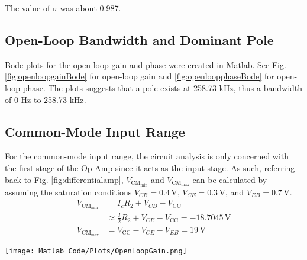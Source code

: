 \documentclass[lettersize,journal]{IEEEtran}
\begin{document}
The value of $\sigma$ was about 0.987.

\subsection{Open-Loop Bandwidth and Dominant Pole}
Bode plots for the open-loop gain and phase were created in Matlab.
See Fig. \ref{fig:openloopgainBode} for open-loop gain and \ref{fig:openloopphaseBode}
for open-loop phase. The plots suggests that a pole exists at 258.73 kHz, thus a 
bandwidth of 0 Hz to 258.73 kHz.

\subsection{Common-Mode Input Range}
For the common-mode input range, the circuit analysis is only 
concerned with the first stage of the Op-Amp since it acts as the 
input stage. As such, referring back to Fig. \ref{fig:differentialamp},
$V_{\text{CM}_{\text{min}}}$ and $V_{\text{CM}_{\text{max}}}$ can be 
calculated by assuming the 
saturation conditions $V_{CB} = 0.4\,$V, $V_{CE} = 0.3\,$V, and $V_{EB} = 0.7\,$V.
\begin{align}
  V_{\text{CM}_{\text{min}}} &= I_cR_2 + V_{CB} - V_{\text{CC}} \\
                             &\approx \frac{I}{2}R_2 + V_{CE} - V_{\text{CC}} = -18.7045\,\text{V} \\
  V_{\text{CM}_{\text{max}}} &= V_{\text{CC}} - V_{CE} - V_{EB} = 19\,\text{V}
\end{align}

\begin{figure*}[!t]
  \centering
  \texttt{[image: Matlab\_Code/Plots/OpenLoopGain.png]}
  \caption{Bode Plot of Open-Loop Gain}
  \label{fig:openloopgainBode}
\end{figure*}
\end{document}
